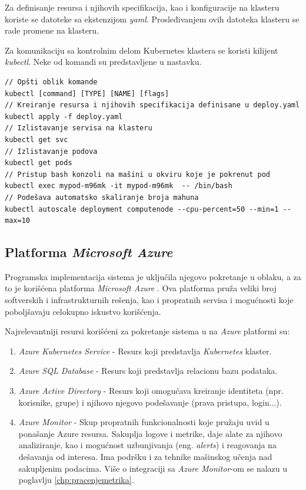 \documentclass[12pt,oneside]{memoir}
\begin{document}
Za definisanje resursa i njihovih specifikacija, kao i konfiguracije na klasteru koriste se datoteke sa ekstenzijom \emph{yaml}. Prosleđivanjem ovih datoteka klasteru se rade promene na klasteru.

Za komunikaciju sa kontrolnim delom Kubernetes klastera se koristi kilijent \emph{kubectl}. Neke od komandi su predstavljene u nastavku.

\begin{verbatim}
// Opšti oblik komande
kubectl [command] [TYPE] [NAME] [flags]
// Kreiranje resursa i njihovih specifikacija definisane u deploy.yaml
kubectl apply -f deploy.yaml
// Izlistavanje servisa na klasteru
kubectl get svc
// Izlistavanje podova
kubectl get pods
// Pristup bash konzoli na mašini u okviru koje je pokrenut pod
kubectl exec mypod-m96mk -it mypod-m96mk  -- /bin/bash
// Podešava automatsko skaliranje broja mahuna
kubectl autoscale deployment computenode --cpu-percent=50 --min=1 --max=10
\end{verbatim}

\subsection{Platforma \emph{Microsoft Azure}}

Programska implementacija sistema je uključila njegovo pokretanje u oblaku, a za to je korišćena platforma \emph{Microsoft Azure} \cite{Azure}. Ova platforma pruža veliki broj softverskih i infrastrukturnih rešenja, kao i propratnih servisa i mogućnosti koje poboljšavaju celokupno iskustvo korišćenja.

Najrelevantniji resursi korišćeni za pokretanje sistema u na \emph{Azure} platformi su:
\begin{enumerate}
\item \emph{Azure Kubernetes Service} \cite{AKS} - Resurs koji predstavlja \emph{Kubernetes} klaster.
\item \emph{Azure SQL Database} \cite{AzureSQLDB} - Resurs koji predstavlja relacionu bazu podataka.
\item \emph{Azure Active Directory} \cite{AAD} - Resurs koji omogućava kreiranje identiteta (npr. korisnike, grupe) i njihovo njegovo podešavanje (prava pristupa, login...).
\item \emph{Azure Monitor} \cite{AzureMonitor} - Skup propratnih funkcionalnosti koje pružaju uvid u ponašanje Azure resursa. Sakuplja logove i metrike, daje alate za njihovo analiziranje, kao i mogućnost uzbunjivanja (eng. \emph{alerts}) i reagovanja na dešavanja od interesa. Ima podršku i za tehnike mašinskog učenja nad sakupljenim podacima. Više o integraciji sa \emph{Azure Monitor}-om se nalazu u poglavlju \ref{chp:pracenjemetrika}.
\end{enumerate}
\end{document}
